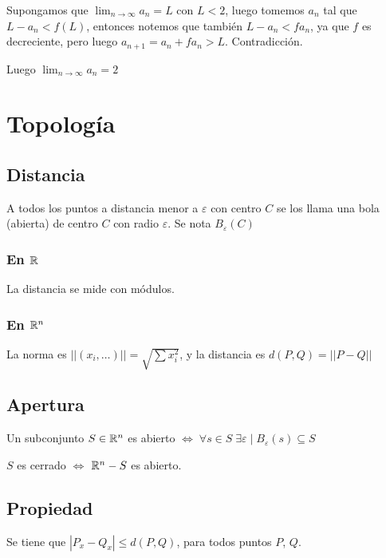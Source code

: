\documentclass{article}
\begin{document}
Supongamos que $\lim_{n \to \infty} a_n = L$ con $L < 2$, luego tomemos $a_n$ tal
que $L - a_n < f(L)$, entonces notemos que también $L - a_n < f a_n$, ya que $f$ es decreciente,
pero luego $a_{n+1} = a_n + f a_n > L$. Contradicción.

Luego $\lim_{n \to \infty} a_n = 2$

\section{Topología}
\subsection{Distancia}

A todos los puntos a distancia menor a $\varepsilon$ con centro $C$ se los llama
una bola (abierta) de centro $C$ con radio $\varepsilon$. Se nota $B_\varepsilon(C)$

\subsubsection{En $\mathbb{R}$}
La distancia se mide con módulos.

\subsubsection{En $\mathbb{R}^n$}
La norma es $||(x_i, \dots)|| = \sqrt{\sum x_i^2}$, y la distancia es $d(P, Q) = ||P-Q||$

\subsection{Apertura}
Un subconjunto $S \in \mathbb{R}^n$ es abierto $\iff \;\forall s \in S \;\exists \varepsilon \mid
B_{\varepsilon}(s) \subseteq S$

$S$ es cerrado $\iff$ $\mathbb{R}^n - S$ es abierto.
\subsection{Propiedad}
Se tiene que $|P_x - Q_x| \leq d(P, Q)$, para todos puntos $P$, $Q$.
\end{document}
